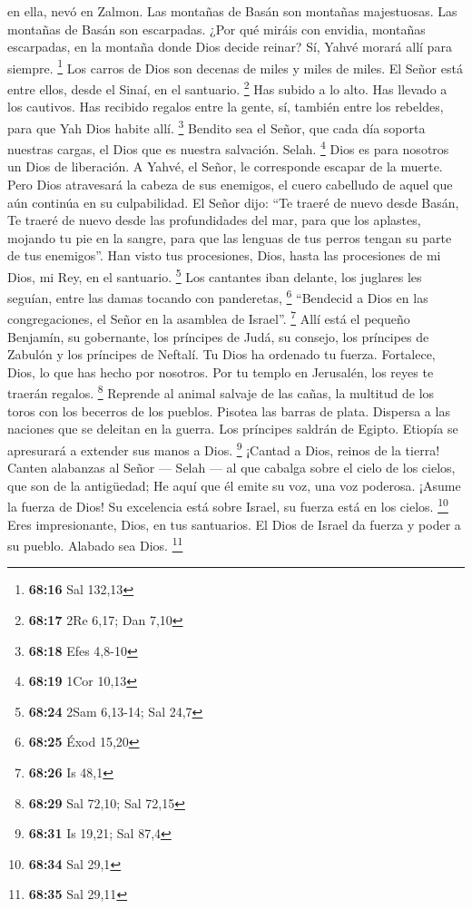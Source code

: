 \begin{paracol}{2}
en ella, nevó en Zalmon.  Las montañas de Basán son
montañas majestuosas. Las montañas de Basán son escarpadas.
 ¿Por qué miráis con envidia, montañas escarpadas, en la
montaña donde Dios decide reinar? Sí, Yahvé morará allí para siempre.
\footnote{\textbf{68:16} Sal 132,13}  Los carros de Dios
son decenas de miles y miles de miles. El Señor está entre ellos, desde
el Sinaí, en el santuario. \footnote{\textbf{68:17} 2Re 6,17; Dan 7,10}
 Has subido a lo alto. Has llevado a los cautivos. Has
recibido regalos entre la gente, sí, también entre los rebeldes, para
que Yah Dios habite allí. \footnote{\textbf{68:18} Efes 4,8-10}
 Bendito sea el Señor, que cada día soporta nuestras
cargas, el Dios que es nuestra salvación. Selah. \footnote{\textbf{68:19}
  1Cor 10,13}  Dios es para nosotros un Dios de
liberación. A Yahvé, el Señor, le corresponde escapar de la muerte.
 Pero Dios atravesará la cabeza de sus enemigos, el cuero
cabelludo de aquel que aún continúa en su culpabilidad. 
El Señor dijo: ``Te traeré de nuevo desde Basán, Te traeré de nuevo
desde las profundidades del mar,  para que los aplastes,
mojando tu pie en la sangre, para que las lenguas de tus perros tengan
su parte de tus enemigos''.  Han visto tus procesiones,
Dios, hasta las procesiones de mi Dios, mi Rey, en el santuario.
\footnote{\textbf{68:24} 2Sam 6,13-14; Sal 24,7}  Los
cantantes iban delante, los juglares les seguían, entre las damas
tocando con panderetas, \footnote{\textbf{68:25} Éxod 15,20}
 ``Bendecid a Dios en las congregaciones, el Señor en la
asamblea de Israel''. \footnote{\textbf{68:26} Is 48,1} 
Allí está el pequeño Benjamín, su gobernante, los príncipes de Judá, su
consejo, los príncipes de Zabulón y los príncipes de Neftalí.
 Tu Dios ha ordenado tu fuerza. Fortalece, Dios, lo que
has hecho por nosotros.  Por tu templo en Jerusalén, los
reyes te traerán regalos. \footnote{\textbf{68:29} Sal 72,10; Sal 72,15}
 Reprende al animal salvaje de las cañas, la multitud de
los toros con los becerros de los pueblos. Pisotea las barras de plata.
Dispersa a las naciones que se deleitan en la guerra. 
Los príncipes saldrán de Egipto. Etiopía se apresurará a extender sus
manos a Dios. \footnote{\textbf{68:31} Is 19,21; Sal 87,4}
 ¡Cantad a Dios, reinos de la tierra! Canten alabanzas al
Señor --- Selah ---  al que cabalga sobre el cielo de los
cielos, que son de la antigüedad; He aquí que él emite su voz, una voz
poderosa.  ¡Asume la fuerza de Dios! Su excelencia está
sobre Israel, su fuerza está en los cielos. \footnote{\textbf{68:34} Sal
  29,1}  Eres impresionante, Dios, en tus santuarios. El
Dios de Israel da fuerza y poder a su pueblo. Alabado sea Dios.
\footnote{\textbf{68:35} Sal 29,11}


\end{paracol}
